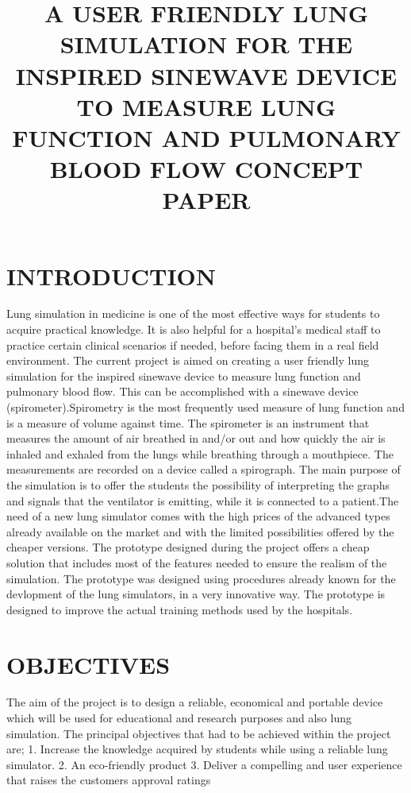 \documentclass{article}
\begin{document}
\title{A USER FRIENDLY LUNG SIMULATION FOR THE INSPIRED SINEWAVE DEVICE TO MEASURE LUNG FUNCTION AND PULMONARY BLOOD FLOW 
CONCEPT PAPER}

\maketitle



\section{INTRODUCTION}
Lung simulation in medicine is one of the most effective ways for students to acquire practical knowledge.
It is also helpful for a hospital’s medical staff to practice certain clinical scenarios if needed, before facing them in a real field environment. The current project is aimed on creating a user friendly lung simulation for the inspired sinewave device to measure lung function and pulmonary blood flow.
This can be accomplished with a sinewave device (spirometer).Spirometry is the most frequently used measure of lung function and is a measure of volume against time. The spirometer is an instrument that measures the amount of air breathed in and/or out and how
 quickly the air is inhaled and exhaled from the lungs while breathing through a mouthpiece. The measurements are recorded on a device called a spirograph. The main purpose of the simulation is to offer the students the possibility of interpreting the graphs and signals that the ventilator is emitting, while it is connected to a patient.The need of a new lung simulator comes with the high prices of the advanced types already available on the market and with the limited possibilities offered by the cheaper versions.
The prototype designed during the project offers a cheap solution that includes most of the features needed to ensure the realism of the simulation. The prototype was designed using procedures already known for the devlopment of the lung simulators, in a very innovative way. The prototype is designed to improve the actual training methods used by the hospitals.

\section{OBJECTIVES}
The aim of the project is to design a reliable, economical and portable device which will be used for educational and research purposes and also lung simulation. The principal objectives that had to be achieved within the project are;
1. Increase the knowledge acquired by students while using a reliable lung simulator.
2. An eco-friendly product
3. Deliver a compelling and user experience that raises the customers approval ratings
\end{document}
